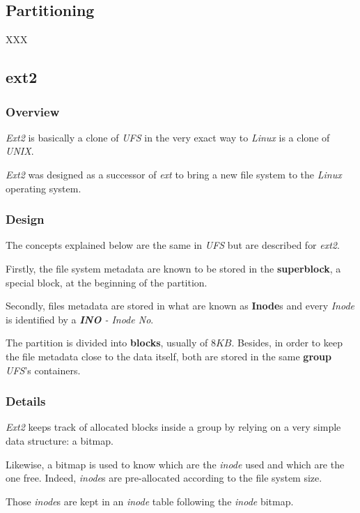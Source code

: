 
\subsection{Partitioning}

XXX


\subsection{ext2}


\begin{frame}
  \frametitle{Overview}

  \textit{Ext2} is basically a clone of \textit{UFS} in the very exact way
  to \textit{Linux} is a clone of \textit{UNIX}.

  \-

  \textit{Ext2} was designed as a successor of \textit{ext} to bring a new
  file system to the \textit{Linux} operating system.
\end{frame}


\begin{frame}
  \frametitle{Design}

  The concepts explained below are the same in \textit{UFS} but are described
  for \textit{ext2}.

  \-

  Firstly, the file system metadata are known to be stored in the
  \textbf{superblock}, a special block, at the beginning of the partition.

  \-

  Secondly, files metadata are stored in what are known as \textbf{Inode}s
  and every \textit{Inode} is identified by a \textit{\textbf{INO} - Inode No}.

  \-

  The partition is divided into \textbf{blocks}, usually of $8 KB$.
  Besides, in order to keep the file metadata close to the data itself,
  both are stored in the same \textbf{group} \ie{} \textit{UFS}'s
  containers.
\end{frame}


\begin{frame}
  \frametitle{Details}

  \textit{Ext2} keeps track of allocated blocks inside a group by relying
  on a very simple data structure: a bitmap.

  \-

  Likewise, a bitmap is used to know which are the \textit{inode} used and
  which are the one free. Indeed, \textit{inode}s are pre-allocated according
  to the file system size.

  \-

  Those \textit{inode}s are kept in an \textit{inode} table following the
  \textit{inode} bitmap.
\end{frame}

